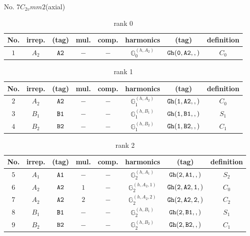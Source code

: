 \documentclass[fleqn,8pt]{jsarticle}
\begin{document}
\setcounter{MaxMatrixCols}{16}

\begin{center}
\LARGE
No. 7\quad$C_{2v}$\quad$mm2$\quad[ orthorhombic ] (axial)
\end{center}
\begin{table}[ht!]
\begin{center}
\caption{rank 0}
\renewcommand{\arraystretch}{1.3}
\begin{tabular}{cccccccc} \hline \hline
No. & irrep. & (tag) & mul. & comp. & harmonics & (tag) & definition \\ \hline
$ 1 $ & $ A_{2} $ & $ {\tt A2} $ & $ - $ & $ - $ & $ \mathbb{G}_{0}^{(h,A_{2})} $ & $ {\tt Gh(0,A2,,)} $ & $ C_{0} $ \\
 \hline \hline
\end{tabular}
\end{center}
\end{table}
\begin{table}[ht!]
\begin{center}
\caption{rank 1}
\renewcommand{\arraystretch}{1.3}
\begin{tabular}{cccccccc} \hline \hline
No. & irrep. & (tag) & mul. & comp. & harmonics & (tag) & definition \\ \hline
$ 2 $ & $ A_{2} $ & $ {\tt A2} $ & $ - $ & $ - $ & $ \mathbb{G}_{1}^{(h,A_{2})} $ & $ {\tt Gh(1,A2,,)} $ & $ C_{0} $ \\
$ 3 $ & $ B_{1} $ & $ {\tt B1} $ & $ - $ & $ - $ & $ \mathbb{G}_{1}^{(h,B_{1})} $ & $ {\tt Gh(1,B1,,)} $ & $ S_{1} $ \\
$ 4 $ & $ B_{2} $ & $ {\tt B2} $ & $ - $ & $ - $ & $ \mathbb{G}_{1}^{(h,B_{2})} $ & $ {\tt Gh(1,B2,,)} $ & $ C_{1} $ \\
 \hline \hline
\end{tabular}
\end{center}
\end{table}
\begin{table}[ht!]
\begin{center}
\caption{rank 2}
\renewcommand{\arraystretch}{1.3}
\begin{tabular}{cccccccc} \hline \hline
No. & irrep. & (tag) & mul. & comp. & harmonics & (tag) & definition \\ \hline
$ 5 $ & $ A_{1} $ & $ {\tt A1} $ & $ - $ & $ - $ & $ \mathbb{G}_{2}^{(h,A_{1})} $ & $ {\tt Gh(2,A1,,)} $ & $ S_{2} $ \\
$ 6 $ & $ A_{2} $ & $ {\tt A2} $ & $ 1 $ & $ - $ & $ \mathbb{G}_{2}^{(h,A_{2},1)} $ & $ {\tt Gh(2,A2,1,)} $ & $ C_{0} $ \\
$ 7 $ & $ A_{2} $ & $ {\tt A2} $ & $ 2 $ & $ - $ & $ \mathbb{G}_{2}^{(h,A_{2},2)} $ & $ {\tt Gh(2,A2,2,)} $ & $ C_{2} $ \\
$ 8 $ & $ B_{1} $ & $ {\tt B1} $ & $ - $ & $ - $ & $ \mathbb{G}_{2}^{(h,B_{1})} $ & $ {\tt Gh(2,B1,,)} $ & $ S_{1} $ \\
$ 9 $ & $ B_{2} $ & $ {\tt B2} $ & $ - $ & $ - $ & $ \mathbb{G}_{2}^{(h,B_{2})} $ & $ {\tt Gh(2,B2,,)} $ & $ C_{1} $ \\
 \hline \hline
\end{tabular}
\end{center}
\end{table}
\end{document}
